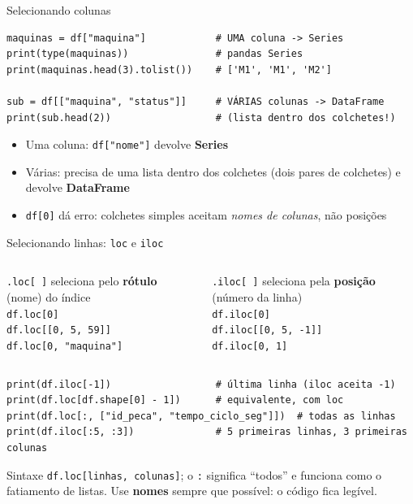 \documentclass[aspectratio=169,10pt,t]{beamer}
\begin{document}
\begin{frame}[fragile]{Selecionando colunas}
\begin{lstlisting}
maquinas = df["maquina"]            # UMA coluna -> Series
print(type(maquinas))               # pandas Series
print(maquinas.head(3).tolist())    # ['M1', 'M1', 'M2']

sub = df[["maquina", "status"]]     # VÁRIAS colunas -> DataFrame
print(sub.head(2))                  # (lista dentro dos colchetes!)
\end{lstlisting}
  \begin{itemize}
    \item Uma coluna: \texttt{df["nome"]} devolve \textbf{Series}
    \item Várias: precisa de uma \alert{lista} dentro dos colchetes (dois pares de colchetes) e devolve \textbf{DataFrame}
    \item \texttt{df[0]} dá erro: colchetes simples aceitam \emph{nomes de colunas}, não posições
  \end{itemize}
\end{frame}

\begin{frame}[fragile]{Selecionando linhas: \texttt{loc} e \texttt{iloc}}
  \begin{columns}[T]
    \begin{block}{\texttt{.loc[ ]}}
      seleciona pelo \textbf{rótulo} (nome) do índice\\
      \texttt{df.loc[0]}\\
      \texttt{df.loc[[0, 5, 59]]}\\
      \texttt{df.loc[0, "maquina"]}
    \end{block}
    \begin{block}{\texttt{.iloc[ ]}}
      seleciona pela \textbf{posição} (número da linha)\\
      \texttt{df.iloc[0]}\\
      \texttt{df.iloc[[0, 5, -1]]}\\
      \texttt{df.iloc[0, 1]}
    \end{block}
  \end{columns}
  \vspace{1ex}
\begin{lstlisting}
print(df.iloc[-1])                  # última linha (iloc aceita -1)
print(df.loc[df.shape[0] - 1])      # equivalente, com loc
print(df.loc[:, ["id_peca", "tempo_ciclo_seg"]])  # todas as linhas
print(df.iloc[:5, :3])              # 5 primeiras linhas, 3 primeiras colunas
\end{lstlisting}
  \small Sintaxe \texttt{df.loc[linhas, colunas]}; o \texttt{:} significa ``todos'' e funciona como o fatiamento de listas. Use \textbf{nomes} sempre que possível: o código fica legível.
\end{frame}
\end{document}

